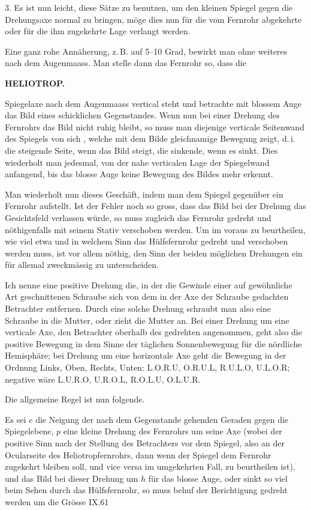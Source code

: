 3. Es ist nun leicht, diese Sätze zu benutzen, um den kleinen Spiegel
gegen die Drehungsaxe normal zu bringen, möge dies nun für die vom Fernrohr
abgekehrte oder für die ihm zugekehrte Lage verlangt werden.

Eine ganz rohe Annäherung, z.\,B. auf 5--10 Grad, bewirkt man ohne
weiteres nach dem Augenmaass. Man stelle dann das Fernrohr so, dass die

\clearpage
\noindent\null\hfill{\small\textbf{HELIOTROP.}}\hfill{}\par\medskip
\noindent Spiegelaxe nach dem Augenmaass vertical steht und betrachte mit blossem
Auge das Bild eines schicklichen Gegenstandes. Wenn nun bei einer Drehung
des Fernrohrs das Bild nicht ruhig bleibt, so muss man diejenige verticale
Seitenwand des Spiegels von sich , welche mit dem Bilde gleichnamige
Bewegung zeigt, d.\,i. die steigende Seite, wenn das Bild steigt, die
sinkende, wenn es sinkt. Dies wiederholt man jedesmal, von der nahe verticalen
Lage der Spiegelwand anfangend, bis das blosse Auge keine Bewegung
des Bildes mehr erkennt.

Man wiederholt nun dieses Geschäft, indem man dem Spiegel gegenüber
ein Fernrohr aufstellt. Ist der Fehler noch so gross, dass das Bild bei der
Drehung das Gesichtsfeld verlassen würde, so muss zugleich das Fernrohr gedreht
und nöthigenfalls mit seinem Stativ verschoben werden. Um im voraus
zu beurtheilen, wie viel etwa und in welchem Sinn das Hülfsfernrohr gedreht
und verschoben werden muss, ist vor allem nöthig, den Sinn der beiden möglichen
Drehungen ein für allemal zweckmässig zu unterscheiden.

Ich nenne eine positive Drehung die, in der die Gewinde einer auf gewöhnliche
Art geschnittenen Schraube sich von dem in der Axe der Schraube
gedachten Betrachter entfernen. Durch eine solche Drehung schraubt man
also eine Schraube in die Mutter, oder zieht die Mutter an. Bei einer Drehung
um eine verticale Axe, den Betrachter oberhalb des gedrehten angenommen,
geht also die positive Bewegung in dem Sinne der täglichen Sonnenbewegung
für die nördliche Hemisphäre; bei Drehung um eine horizontale Axe
geht die Bewegung in der Ordnung Links, Oben, Rechts, Unten: L.O.R.U,
O.R.U.L, R.U.L.O, U.L.O.R; negative wäre L.U.R.O, U.R.O.L, R.O.L.U,
O.L.U.R.

Die allgemeine Regel ist nun folgende.

Es sei $e$ die Neigung der nach dem Gegenstande gehenden Geraden gegen
die Spiegelebene, $p$ eine kleine Drehung des Fernrohrs um seine Axe (wobei
der positive Sinn nach der Stellung des Betrachters vor dem Spiegel, also an
der Ocularseite des Heliotropfernrohrs, dann wenn der Spiegel dem Fernrohr
zugekehrt bleiben soll, und vice versa im umgekehrten Fall, zu beurtheilen
ist), und  das Bild bei dieser Drehung um $h$ für das blosse Auge, oder
sinkt so viel beim Sehen durch das Hülfsfernrohr, so muss behuf der Berichtigung
gedreht werden um die Grösse
\vfill\noindent IX.\hfill61

